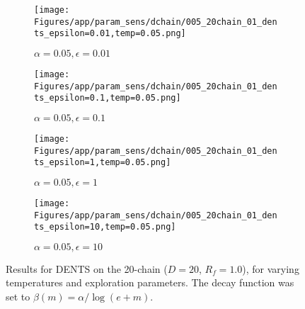 \documentclass{article}
\theoremstyle{plain}
\begin{document}
\begin{appendices}
\begin{figure}
                \begin{subfigure}[b]{0.24\textwidth}
                    \centering
                    \texttt{[image: Figures/app/param\_sens/dchain/005\_20chain\_01\_dents\_epsilon=0.01,temp=0.05.png]}
                    \caption*{$\alpha=0.05,\epsilon=0.01$}
                \end{subfigure}
                \begin{subfigure}[b]{0.24\textwidth}
                    \centering
                    \texttt{[image: Figures/app/param\_sens/dchain/005\_20chain\_01\_dents\_epsilon=0.1,temp=0.05.png]}
                    \caption*{$\alpha=0.05,\epsilon=0.1$}
                \end{subfigure}
                \begin{subfigure}[b]{0.24\textwidth}
                    \centering
                    \texttt{[image: Figures/app/param\_sens/dchain/005\_20chain\_01\_dents\_epsilon=1,temp=0.05.png]}
                    \caption*{$\alpha=0.05,\epsilon=1$}
                \end{subfigure}
                \begin{subfigure}[b]{0.24\textwidth}
                    \centering
                    \texttt{[image: Figures/app/param\_sens/dchain/005\_20chain\_01\_dents\_epsilon=10,temp=0.05.png]}
                    \caption*{$\alpha=0.05,\epsilon=10$}
                \end{subfigure}
                
                \caption{Results for DENTS on the 20-chain ($D=20$, $R_f=1.0$), for varying temperatures and exploration parameters. The decay function was set to $\beta(m)=\alpha/\log(e+m)$.}
                \label{fig:dents_20chain_hps}
            \end{figure}


            \begin{figure}
                \centering
                

\end{figure}
\end{appendices}
\end{document}
